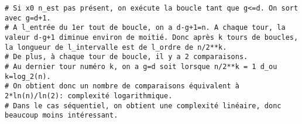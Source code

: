 \ifprof
\begin{corrige}
\end{corrige}
\else
\fi

\ifprof
\begin{corrige}
\end{corrige}
\else
\fi

\ifprof
\begin{corrige}
\begin{lstlisting}
# Si x0 n_est pas présent, on exécute la boucle tant que g<=d. On sort avec g=d+1.
# A l_entrée du 1er tout de boucle, on a d-g+1=n. A chaque tour, la valeur d-g+1 diminue environ de moitié. Donc après k tours de boucles, la longueur de l_intervalle est de l_ordre de n/2**k.
# De plus, à chaque tour de boucle, il y a 2 comparaisons.
# Au dernier tour numéro k, on a g=d soit lorsque n/2**k = 1 d_ou k=log_2(n).
# On obtient donc un nombre de comparaisons équivalent à 2*ln(n)/ln(2): complexité logarithmique.
# Dans le cas séquentiel, on obtient une complexité linéaire, donc beaucoup moins intéressant.
\end{lstlisting}
\end{corrige}
\else
\fi
%
%
%
%
%
%
%
